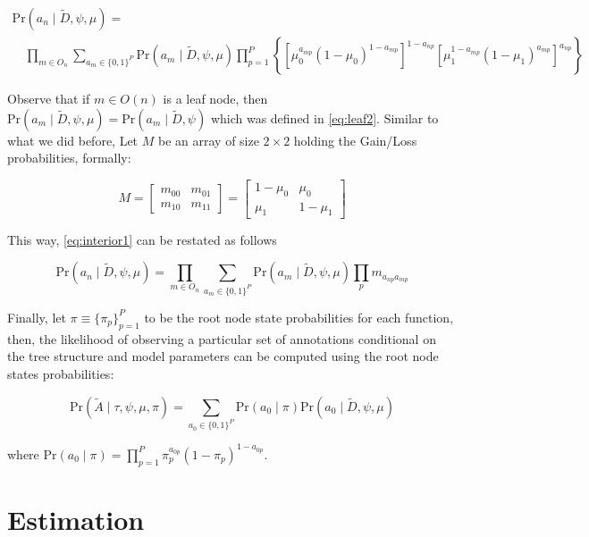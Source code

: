\documentclass{article}
\newcommand{\Prcond}[2]{{\mbox{Pr}\left(#1\;|\;#2\right) }}
\begin{document}
\begin{multline} 
\label{eq:interior1}
\Prcond{a_n}{\tilde D, \psi,\mu} =  \\
\quad\prod_{m \in O_n} \sum_{a_m \in \{0,1\}^P} \Prcond{a_m}{\tilde D, \psi,\mu}
\prod_{p = 1}^P \left\{\left[\mu_0^{a_{mp}}(1-\mu_0)^{1 - a_{mp}}\right]^{1 - a_{np}}
  \left[\mu_1^{1 - a_{mp}}(1-\mu_1)^{a_{mp}}\right]^{a_{np}}\right\} 
\end{multline}

Observe that if $m\in O(n)$ is a leaf node, then $\Prcond{a_m}{\tilde D, \psi,\mu} = \Prcond{a_m}{\tilde D, \psi}$ which was defined in \eqref{eq:leaf2}. Similar to what we did before, Let $M$ be an array of size $2\times 2$ holding the Gain/Loss probabilities, formally: 

$$
M = \left[\begin{array}{cc}
m_{00} & m_{01} \\
m_{10} & m_{11}
\end{array}\right]
= \left[\begin{array}{cc}
1-\mu_0 & \mu_0 \\
\mu_1 & 1 - \mu_1
\end{array}\right]
$$

This way, \eqref{eq:interior1} can be restated as follows

\begin{equation}
\label{eq:interior2}
\Prcond{a_n}{\tilde D, \psi,\mu} = \prod_{m \in O_n} \sum_{a_m \in \{0,1\}^P} \Prcond{a_m}{\tilde D, \psi,\mu}
\prod_p m_{a_{np}a_{mp}}
\end{equation}

Finally, let $\pi\equiv\{\pi_p\}_{p=1}^{P}$ to be the root node state probabilities for each function, then, the likelihood of observing a particular set of annotations conditional on the tree structure and model parameters can be computed using the root node states probabilities:

\begin{equation}
\label{eq:ll}
\Prcond{\tilde A}{\tau,\psi, \mu, \pi} = \sum_{a_0 \in \{0,1\}^P} \Prcond{a_0}{\pi} \Prcond{a_0}{\tilde D,\psi,\mu}
\end{equation}

where $\Prcond{a_0}{\pi} = \prod_{p=1}^P \pi_p^{a_{0p}}\left(1 - \pi_p\right)^{1 - a_{0p}}$.

\section{Estimation}
\end{document}
